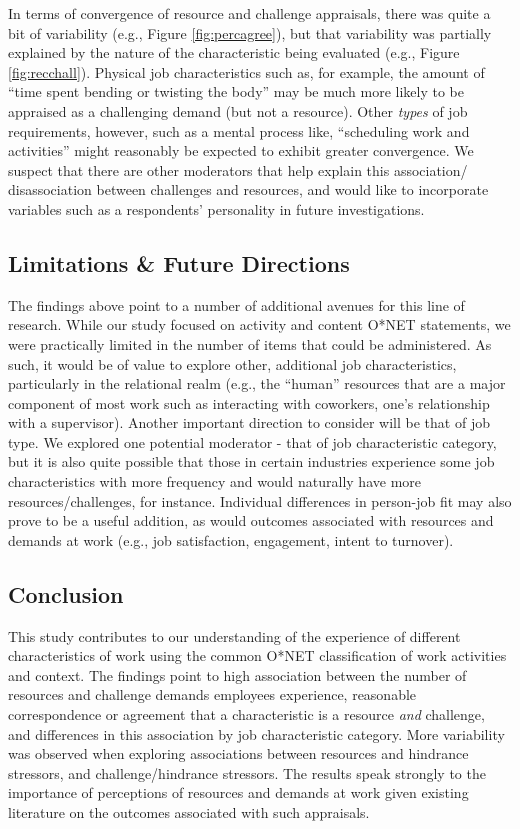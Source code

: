 \documentclass[
  man]{apa6}
\begin{document}
In terms of convergence of resource and challenge appraisals, there was quite a bit of variability (e.g., Figure \ref{fig:percagree}), but that variability was partially explained by the nature of the characteristic being evaluated (e.g., Figure \ref{fig:recchall}). Physical job characteristics such as, for example, the amount of ``time spent bending or twisting the body'' may be much more likely to be appraised as a challenging demand (but not a resource). Other \emph{types} of job requirements, however, such as a mental process like, ``scheduling work and activities'' might reasonably be expected to exhibit greater convergence. We suspect that there are other moderators that help explain this association/ disassociation between challenges and resources, and would like to incorporate variables such as a respondents' personality in future investigations.

\hypertarget{limitations-future-directions}{%
\subsection{Limitations \& Future Directions}\label{limitations-future-directions}}

The findings above point to a number of additional avenues for this line of research. While our study focused on activity and content O*NET statements, we were practically limited in the number of items that could be administered. As such, it would be of value to explore other, additional job characteristics, particularly in the relational realm (e.g., the ``human'' resources that are a major component of most work such as interacting with coworkers, one's relationship with a supervisor). Another important direction to consider will be that of job type. We explored one potential moderator - that of job characteristic category, but it is also quite possible that those in certain industries experience some job characteristics with more frequency and would naturally have more resources/challenges, for instance. Individual differences in person-job fit may also prove to be a useful addition, as would outcomes associated with resources and demands at work (e.g., job satisfaction, engagement, intent to turnover).

\hypertarget{conclusion}{%
\subsection{Conclusion}\label{conclusion}}

This study contributes to our understanding of the experience of different characteristics of work using the common O*NET classification of work activities and context. The findings point to high association between the number of resources and challenge demands employees experience, reasonable correspondence or agreement that a characteristic is a resource \emph{and} challenge, and differences in this association by job characteristic category. More variability was observed when exploring associations between resources and hindrance stressors, and challenge/hindrance stressors. The results speak strongly to the importance of perceptions of resources and demands at work given existing literature on the outcomes associated with such appraisals.
\end{document}
